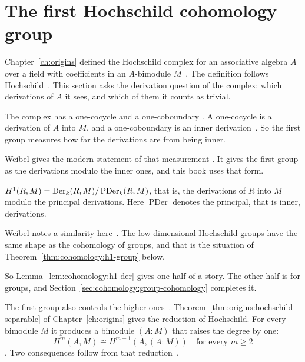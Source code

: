 \section{The first Hochschild cohomology group}\label{sec:cohomology:first-cohomology}

Chapter~\ref{ch:origins} defined the Hochschild complex for an associative
algebra $A$ over a field with coefficients in an
$A$-bimodule $M$~\cite[p.~60]{Hochschild1945}. The definition follows
Hochschild~\cite[p.~60]{Hochschild1945}. This section asks the derivation
question of the complex: which derivations of $A$ it sees, and which of them it
counts as trivial.

The complex has a one-cocycle and a one-coboundary
\cite[p.~60]{Hochschild1945}. A one-cocycle is a derivation of $A$ into $M$,
and a one-coboundary is an inner
derivation~\cite[p.~60]{Hochschild1945}. So the first group measures how far
the derivations are from being inner.

Weibel gives the modern statement of that measurement
\cite[p.~301]{Weibel1994}. It gives the first group as the derivations modulo
the inner ones, and this book uses that form.

\begin{lemma}\label{lem:cohomology:h1-der}
$H^1(R, M) = \operatorname{Der}_k(R, M)/\operatorname{PDer}_k(R, M)$, that is, the
derivations of $R$ into $M$ modulo the principal derivations.
Here $\operatorname{PDer}$ denotes the principal, that is inner, derivations.
\end{lemma}

Weibel notes a similarity here~\cite[p.~301]{Weibel1994}. The low-dimensional
Hochschild groups have the same shape as the cohomology of groups, and that is
the situation of Theorem~\ref{thm:cohomology:h1-group} below.

So Lemma~\ref{lem:cohomology:h1-der} gives one half of a story. The other half
is for groups, and Section~\ref{sec:cohomology:group-cohomology} completes it.

The first group also controls the higher
ones~\cite[Theorem~3.1, p.~60]{Hochschild1945}.
Theorem~\ref{thm:origins:hochschild-separable} of Chapter~\ref{ch:origins} gives
the reduction of Hochschild. For every bimodule $M$ it produces a bimodule
$(A:M)$ that raises the degree by one:
\[
  H^m(A,M) \cong H^{m-1}(A,(A:M)) \quad \text{for every } m \ge 2
\]
\cite[Theorem~3.1, p.~60]{Hochschild1945}. Two consequences follow from that
reduction~\cite[Theorem~3.1, p.~60]{Hochschild1945}.

